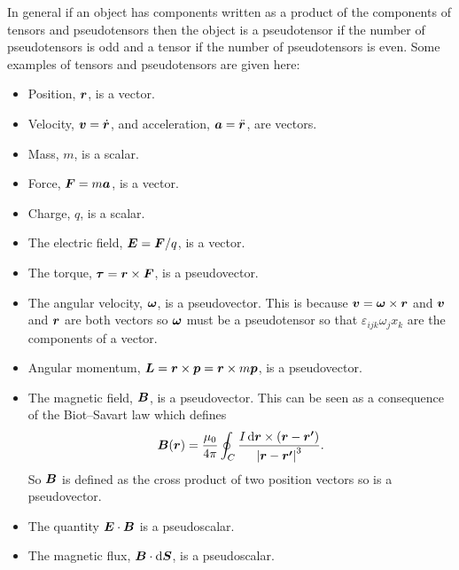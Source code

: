 \documentclass[a4paper]{article}
\begin{document}
    In general if an object has components written as a product of the components of tensors and pseudotensors then the object is a pseudotensor if the number of pseudotensors is odd and a tensor if the number of pseudotensors is even.
    Some examples of tensors and pseudotensors are given here:
    \begin{itemize}
        \item Position, \(\bm{r}\), is a vector.
        \item Velocity, \(\bm{v} = \dot{\bm{r}}\), and acceleration, \(\bm{a} = \ddot{\bm{r}}\), are vectors.
        \item Mass, \(m\), is a scalar.
        \item Force, \(\bm{F} = m\bm{a}\), is a vector.
        \item Charge, \(q\), is a scalar.
        \item The electric field, \(\bm{E} = \bm{F}/q\), is a vector.
        \item The torque, \(\bm{\tau} = \bm{r}\times\bm{F}\), is a pseudovector.
        \item The angular velocity, \(\bm{\omega}\), is a pseudovector.
        This is because \(\bm{v} = \bm{\omega}\times\bm{r}\) and \(\bm{v}\) and \(\bm{r}\) are both vectors so \(\bm{\omega}\) must be a pseudotensor so that \(\varepsilon_{ijk}\omega_jx_k\) are the components of a vector.
        \item Angular momentum, \(\bm{L} = \bm{r}\times\bm{p} = \bm{r}\times m\bm{p}\), is a pseudovector.
        \item The magnetic field, \(\bm{B}\), is a pseudovector.
        This can be seen as a consequence of the Biot--Savart law which defines
        \[\bm{B}(\bm{r}) = \frac{\mu_0}{4\pi}\oint_C \frac{I\dd{\bm{r}\times(\bm{r} - \bm{r'})}}{\abs{\bm{r} - \bm{r'}}^3}.\]
        So \(\bm{B}\) is defined as the cross product of two position vectors so is a pseudovector.
        \item The quantity \(\bm{E}\cdot\bm{B}\) is a pseudoscalar.
        \item The magnetic flux, \(\bm{B}\cdot\dd{\bm{S}}\), is a pseudoscalar.
    \end{itemize}
\end{document}
